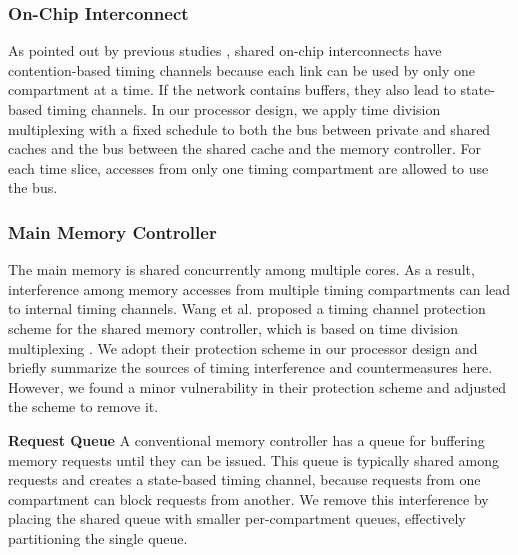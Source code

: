 \subsubsection{On-Chip Interconnect}

As pointed out by previous studies \cite{yaonocs, surfnoc}, shared on-chip 
interconnects
have contention-based timing channels because each link can be used by only 
one compartment at a time. If the network contains buffers, they also lead
to state-based timing channels. In our processor design, we apply time
division multiplexing with a fixed schedule to both the bus between private
and shared caches and the bus between the shared cache and the memory controller.
For each time slice, accesses from only one timing compartment are allowed to
use the bus.

\subsubsection{Main Memory Controller}

The main memory is shared concurrently among multiple cores. As a result,
interference among memory accesses from multiple timing compartments can lead
to internal timing channels. 
Wang et al. proposed a timing channel protection scheme for the shared memory
controller, which is based on time division multiplexing \cite{ushpca14}. 
We adopt their protection scheme in our processor design and briefly summarize 
the sources of timing interference and countermeasures here.
However, we found a minor vulnerability in their protection scheme and
adjusted the scheme to remove it.

\textbf{Request Queue}
A conventional memory controller has a queue for buffering memory requests until
they can be issued. This queue is typically shared among requests and creates
a state-based timing channel, because requests from one compartment can block
requests from another. We remove this interference by placing the shared 
queue with smaller per-compartment queues, effectively partitioning the single queue.

